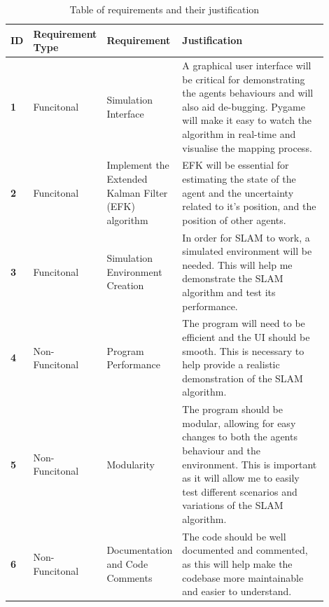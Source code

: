 \documentclass[12pt]{article}
\begin{document}
\begin{table}[H]
    \centering
    \begin{tabular}{|p{0.03\linewidth}|p{0.17\linewidth}|p{0.17\linewidth}|p{0.53\linewidth}|}
        \hline
        \textbf{ID} &
        \textbf{Requirement Type} &
        \textbf{Requirement} &
        \textbf{Justification}\\
        \hline
        \textbf{1} &
        Funcitonal &
        Simulation Interface &
        A graphical user interface will be critical for demonstrating the agents behaviours and will also aid de-bugging. Pygame
        will make it easy to watch the algorithm in real-time and visualise the mapping process.\\
        \hline
        \textbf{2} &
        Funcitonal &
        Implement the Extended Kalman Filter (EFK) algorithm &
        EFK will be essential for estimating the state of the agent and the uncertainty related to it's position, and the position
        of other agents.\\
        \hline
        \textbf{3} &
        Funcitonal &
        Simulation Environment Creation &
        In order for SLAM to work, a simulated environment will be needed. This will help me demonstrate the SLAM algorithm and
        test its performance. \\
        \hline
        \textbf{4} &
        Non-Funcitonal &
        Program Performance &
        The program will need to be efficient and the UI should be smooth. This is necessary to help provide a realistic demonstration
        of the SLAM algorithm.\\
        \hline
        \textbf{5} &
        Non-Funcitonal &
        Modularity &
        The program should be modular, allowing for easy changes to both the agents behaviour and the environment. This is important
        as it will allow me to easily test different scenarios and variations of the SLAM algorithm.\\
        \hline
        \textbf{6} &
        Non-Funcitonal &
        Documentation and Code Comments &
        The code should be well documented and commented, as this will help make the codebase more maintainable and easier to
        understand.\\
        \hline
    \end{tabular}
    \caption{Table of requirements and their justification}\label{tab:requirements_table}
\end{table}\\
\end{document}
